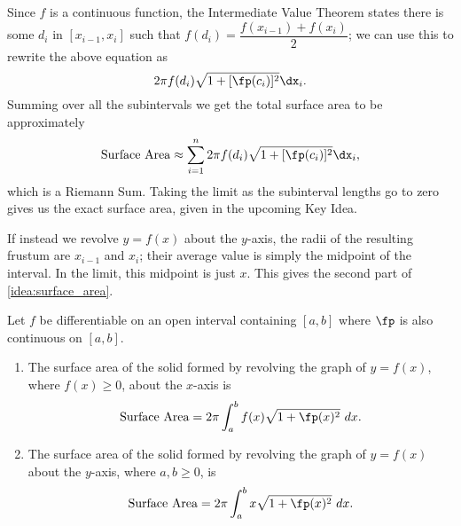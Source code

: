 Since $f$ is a continuous function, the Intermediate Value Theorem states there is some $d_i$ in $[x_{i-1},x_i]$ such that $f(d_i)=\dfrac{f(x_{i-1})+f(x_i)}2$; we can use this to rewrite the above equation as
\[2\pi f(d_i)\sqrt{1+[\fp(c_i)]^2}\dx_i.\]
Summing over all the subintervals we get the total surface area to be approximately 
\[\text{Surface Area}\approx \sum_{i=1}^n 2\pi f(d_i)\sqrt{1+[\fp(c_i)]^2}\dx_i,\]
which is a Riemann Sum. Taking the limit as the subinterval lengths go to zero gives us the exact surface area, given in the upcoming Key Idea.

If instead we revolve $y=f(x)$ about the $y$-axis, the radii of the resulting frustum are $x_{i-1}$ and $x_i$; their average value is simply the midpoint of the interval. In the limit, this midpoint is just $x$. This gives the second part of \autoref{idea:surface_area}.

{Let $f$ be differentiable on an open interval containing $[a,b]$ where $\fp$ is also continuous on $[a,b]$. 
\begin{enumerate}
	\item	The surface area of the solid formed by revolving the graph of $y=f(x)$, where $f(x)\geq0$, about the $x$-axis is
	$$\text{Surface Area} = 2\pi\int_a^b f(x)\sqrt{1+\fp(x)^2}\ dx.$$
	\item	The surface area of the solid formed by revolving the graph of $y=f(x)$ about the $y$-axis, where $a,b\geq0$, is
	$$\text{Surface Area} = 2\pi\int_a^b x\sqrt{1+\fp(x)^2}\ dx.$$
\end{enumerate}}

